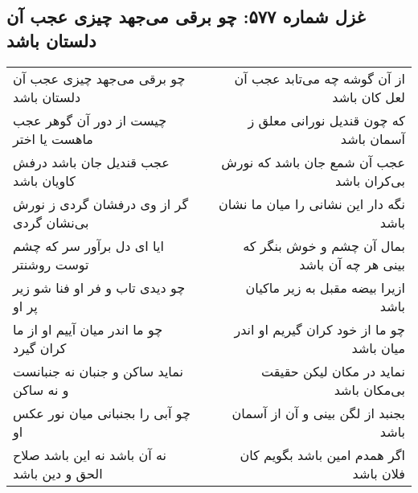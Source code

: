 \begin{center}
\section*{غزل شماره ۵۷۷: چو برقی می‌جهد چیزی عجب آن دلستان باشد}
\label{sec:0577}
\begin{longtable}{l p{0.5cm} r}
چو برقی می‌جهد چیزی عجب آن دلستان باشد
&&
از آن گوشه چه می‌تابد عجب آن لعل کان باشد
\\
چیست از دور آن گوهر عجب ماهست یا اختر
&&
که چون قندیل نورانی معلق ز آسمان باشد
\\
عجب قندیل جان باشد درفش کاویان باشد
&&
عجب آن شمع جان باشد که نورش بی‌کران باشد
\\
گر از وی درفشان گردی ز نورش بی‌نشان گردی
&&
نگه دار این نشانی را میان ما نشان باشد
\\
ایا ای دل برآور سر که چشم توست روشنتر
&&
بمال آن چشم و خوش بنگر که بینی هر چه آن باشد
\\
چو دیدی تاب و فر او فنا شو زیر پر او
&&
ازیرا بیضه مقبل به زیر ماکیان باشد
\\
چو ما اندر میان آییم او از ما کران گیرد
&&
چو ما از خود کران گیریم او اندر میان باشد
\\
نماید ساکن و جنبان نه جنبانست و نه ساکن
&&
نماید در مکان لیکن حقیقت بی‌مکان باشد
\\
چو آبی را بجنبانی میان نور عکس او
&&
بجنبد از لگن بینی و آن از آسمان باشد
\\
نه آن باشد نه این باشد صلاح الحق و دین باشد
&&
اگر همدم امین باشد بگویم کان فلان باشد
\\
\end{longtable}
\end{center}
